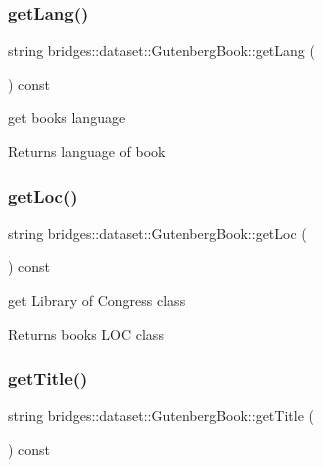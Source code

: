 \subsubsection{\texorpdfstring{get\+Lang()}{getLang()}}
{\footnotesize\ttfamily string bridges\+::dataset\+::\+Gutenberg\+Book\+::get\+Lang (\begin{DoxyParamCaption}{ }\end{DoxyParamCaption}) const\hspace{0.3cm}{\ttfamily [inline]}}

get book\textquotesingle{}s language \begin{DoxyReturn}{Returns}
language of book 
\end{DoxyReturn}
\mbox{\label{classbridges_1_1dataset_1_1_gutenberg_book_a1daccd8ce343c88ce4880b6008cefa52}} 
\subsubsection{\texorpdfstring{get\+Loc()}{getLoc()}}
{\footnotesize\ttfamily string bridges\+::dataset\+::\+Gutenberg\+Book\+::get\+Loc (\begin{DoxyParamCaption}{ }\end{DoxyParamCaption}) const\hspace{0.3cm}{\ttfamily [inline]}}

get Library of Congress class \begin{DoxyReturn}{Returns}
book\textquotesingle{}s L\+OC class 
\end{DoxyReturn}
\mbox{\label{classbridges_1_1dataset_1_1_gutenberg_book_a40fe78ea917df1212d1918da4dcfeb7a}} 
\subsubsection{\texorpdfstring{get\+Title()}{getTitle()}}
{\footnotesize\ttfamily string bridges\+::dataset\+::\+Gutenberg\+Book\+::get\+Title (\begin{DoxyParamCaption}{ }\end{DoxyParamCaption}) const\hspace{0.3cm}{\ttfamily [inline]}}


